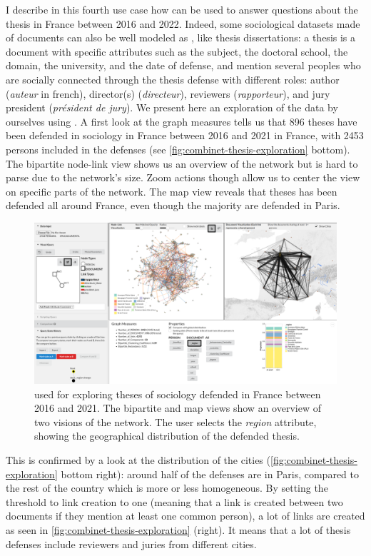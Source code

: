 I describe in this fourth use case how \name can be used to answer questions about the thesis in France between 2016 and 2022.
Indeed, some sociological datasets made of documents can also be well modeled as \modelplural, like thesis dissertations: a thesis is a document with specific attributes such as the subject, the doctoral school, the domain, the university, and the date of defense, and mention several peoples who are socially connected through the thesis defense with different roles: author (\textit{auteur} in french), director(s) (\textit{directeur}), reviewers (\textit{rapporteur}), and jury president (\textit{président de jury}).
We present here an exploration of the data by ourselves using \name.
A first look at the graph measures tells us that 896 theses have been defended in sociology in France between 2016 and 2021 in France, with 2453 persons included in the defenses (see \autoref{fig:combinet-thesis-exploration} bottom).
The bipartite node-link view shows us an overview of the network but is hard to parse due to the network's size.
Zoom actions though allow us to center the view on specific parts of the network.
The map view reveals that theses has been defended all around France, even though the majority are defended in Paris.
\begin{figure}[!ht]
    \centering
    \includegraphics[width=1\textwidth]{static/figures/ComBiNet/Thesis-first-exploration}
    \caption{\name used for exploring theses of sociology defended in France between 2016 and 2021. The bipartite and map views show an overview of two visions of the network. The user selects the \textit{region} attribute, showing the geographical distribution of the defended thesis.}\label{fig:combinet-thesis-exploration}
\end{figure}
This is confirmed by a look at the distribution of the cities (\autoref{fig:combinet-thesis-exploration} bottom right): around half of the defenses are in Paris, compared to the rest of the country which is more or less homogeneous.
By setting the threshold to link creation to one (meaning that a link is created between two documents if they mention at least one common person), a lot of links are created as seen in \autoref{fig:combinet-thesis-exploration} (right).
It means that a lot of thesis defenses include reviewers and juries from different cities.

